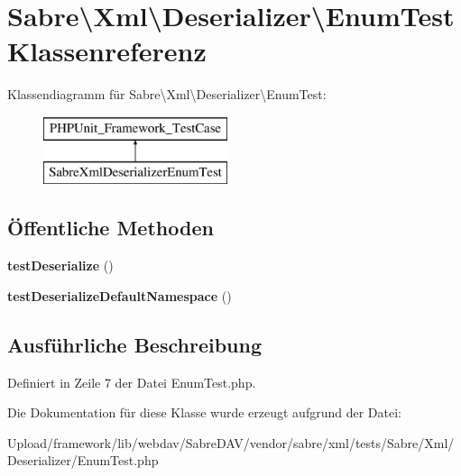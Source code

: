 \hypertarget{class_sabre_1_1_xml_1_1_deserializer_1_1_enum_test}{}\section{Sabre\textbackslash{}Xml\textbackslash{}Deserializer\textbackslash{}Enum\+Test Klassenreferenz}
\label{class_sabre_1_1_xml_1_1_deserializer_1_1_enum_test}
Klassendiagramm für Sabre\textbackslash{}Xml\textbackslash{}Deserializer\textbackslash{}Enum\+Test\+:\begin{figure}[H]
\begin{center}
\leavevmode
\includegraphics[height=2.000000cm]{class_sabre_1_1_xml_1_1_deserializer_1_1_enum_test}
\end{center}
\end{figure}
\subsection*{Öffentliche Methoden}
\begin{DoxyCompactItemize}
\item 
\mbox{\label{class_sabre_1_1_xml_1_1_deserializer_1_1_enum_test_a5a90d9a1ab0881cc70fc5698b390ccca}} 
{\bfseries test\+Deserialize} ()
\item 
\mbox{\label{class_sabre_1_1_xml_1_1_deserializer_1_1_enum_test_a7b4ac074e058001ecee107affd7db09d}} 
{\bfseries test\+Deserialize\+Default\+Namespace} ()
\end{DoxyCompactItemize}


\subsection{Ausführliche Beschreibung}


Definiert in Zeile 7 der Datei Enum\+Test.\+php.



Die Dokumentation für diese Klasse wurde erzeugt aufgrund der Datei\+:\begin{DoxyCompactItemize}
\item 
Upload/framework/lib/webdav/\+Sabre\+D\+A\+V/vendor/sabre/xml/tests/\+Sabre/\+Xml/\+Deserializer/Enum\+Test.\+php\end{DoxyCompactItemize}
